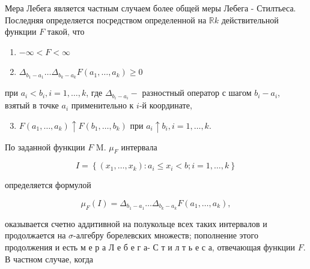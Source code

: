 \documentclass[10pt]{article}
\begin{document}
Мера Лебега является частным случаем более общей меры Лебега - Стилтьеса. Последняя определяется посредством определенной на $\mathbb{R} k$ действительной функции $F$ такой, что



\begin{enumerate}

  \item $-\infty<F<\infty$



  \item $\Delta_{b_{1}-a_{1}} \ldots \Delta_{b_{k}-a_{k}} F\left(a_{1}, \ldots, a_{k}\right) \geqslant 0$



\end{enumerate}



при $a_{i}<b_{i}, i=1, \ldots, k$, где $\Delta_{b_{i}-a_{i}}-$ разностный оператор с шагом $b_{i}-a_{i}$, взятый в точке $a_{i}$ применительно к $i$-й координате,



\begin{enumerate}

  \setcounter{enumi}{2}

  \item $F\left(a_{1}, \ldots, a_{k}\right) \uparrow F\left(b_{1}, \ldots, b_{k}\right)$ при $a_{i} \uparrow b_{i}, i=1, \ldots, k$.

\end{enumerate}



По заданной функции $F$ M. $\mu_{F}$ интервала



\[

I=\left\{\left(x_{1}, \ldots, x_{k}\right): a_{i} \leqslant x_{i}<b ; i=1, \ldots, k\right\}

\]



определяется формулой



\[

\mu_{F}(I)=\Delta_{b_{1}-a_{1}} \ldots \Delta_{b_{k}-a_{k}} F\left(a_{1}, \ldots, a_{k}\right),

\]



оказывается счетно аддитивной на полукольце всех таких интервалов и продолжается на $\sigma$-алгебру борелевских множеств; пополнение этого продолжения и есть м е р а Л е б е г а- С т и л т ь е с а, отвечающая функции $F$. В частном случае, когда
\end{document}
